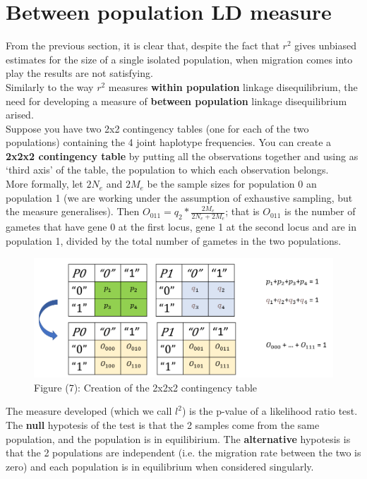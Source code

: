 \documentclass[a4paper,12pt]{article}
\begin{document}
\section{Between population LD measure}
From the previous section, it is clear that, despite the fact that $r^2$ gives unbiased estimates for the size of a single isolated population, when migration comes into play the results are not satisfying.\\
Similarly to the way $r^2$ measures \textbf{within population} linkage disequilibrium, the need for developing a measure of  \textbf{between population} linkage disequilibrium arised.\\

Suppose you have two 2x2 contingency tables (one for each of the two populations) containing the 4 joint haplotype frequencies.
You can create a \textbf{2x2x2 contingency table} by putting all the observations together and using as `third axis' of the table, the population to which each observation belongs.\\
More formally, let  $2N_e$ and $2M_e$ be the sample sizes for population 0 an population 1 (we are working under the assumption of exhaustive sampling, but the measure generalises). Then $O_{011} = q_2*\frac{2M_e}{2N_e + 2M_e}$; that is  $O_{011}$ is the number of gametes that have gene 0 at the first locus, gene 1 at the second locus and are in population 1, divided by the total number of gametes in the two populations.

\begin{figure}[H]
    
    \includegraphics[scale=0.8]{7.png}%
    \caption*{Figure (7): Creation of the 2x2x2 contingency table}%
\end{figure}%

The measure developed (which we call $l^2$) is the p-value of a likelihood ratio test.
The \textbf{null} hypotesis of the test is that the 2 samples come from the same population, and the population is in equilibirium.
The \textbf{alternative} hypotesis is that the 2 populations are independent (i.e. the migration rate
between the two is zero) and each population is in equilibrium when considered singularly.\\
\end{document}
